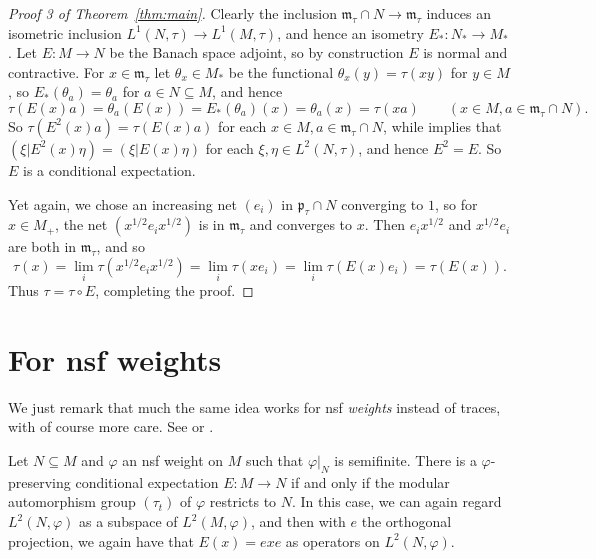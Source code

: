 \documentclass[a4paper,11pt]{article}
\newcommand{\mf}[1]{{\mathfrak{#1}}}
\theoremstyle{definition}
\begin{document}
\begin{proof}[{Proof 3 of Theorem~\ref{thm:main}}]
Clearly the inclusion $\mf m_\tau \cap N \to \mf m_\tau$ induces an isometric inclusion $L^1(N,\tau) \to L^1(M,\tau)$, and hence an isometry $E_* \colon N_* \to M_*$.  Let $E \colon M \to N$ be the Banach space adjoint, so by construction $E$ is normal and contractive.  For $x\in \mf m_\tau$ let $\theta_x \in M_*$ be the functional $\theta_x(y) = \tau(xy)$ for $y\in M$, so $E_*(\theta_a) = \theta_a$ for $a\in N\subseteq M$, and hence
\[ \tau(E(x)a) = \theta_a(E(x)) = E_*(\theta_a)(x) = \theta_a(x) = \tau(xa)
\qquad (x\in M, a\in\mf m_\tau\cap N). \]
So $\tau(E^2(x)a) = \tau(E(x)a)$ for each $x\in M, a\in\mf m_\tau\cap N$, while implies that $(\xi|E^2(x)\eta) = (\xi|E(x)\eta)$ for each $\xi,\eta\in L^2(N,\tau)$, and hence $E^2=E$.  So $E$ is a conditional expectation.  

Yet again, we chose an increasing net $(e_i)$ in $\mf p_\tau \cap N$ converging to $1$, so for $x\in M_+$, the net $(x^{1/2}e_ix^{1/2})$ is in $\mf m_\tau$ and converges to $x$.  Then $e_i x^{1/2}$ and $x^{1/2}e_i$ are both in $\mf m_\tau$, and so
\[ \tau(x) = \lim_i \tau(x^{1/2}e_ix^{1/2}) = \lim_i \tau(xe_i)
= \lim_i \tau(E(x)e_i)
= \tau(E(x)). \]
Thus $\tau = \tau\circ E$, completing the proof.
\end{proof}



\section{For nsf weights}

We just remark that much the same idea works for nsf \emph{weights} instead of traces, with of course more care.  See \cite[Theorem~III.4.7.7]{Blackadar_OperatorAlgebrasBook} or \cite[Chapter~, Theorem~4.2]{TakesakiII}.

Let $N\subseteq M$ and $\varphi$ an nsf weight on $M$ such that $\varphi|_N$ is semifinite.  There is a $\varphi$-preserving conditional expectation $E\colon M \to N$ if and only if the modular automorphism group $(\tau_t)$ of $\varphi$ restricts to $N$.  In this case, we can again regard $L^2(N,\varphi)$ as a subspace of $L^2(M,\varphi)$, and then with $e$ the orthogonal projection, we again have that $E(x) = exe$ as operators on $L^2(N, \varphi)$.





%
\end{document}
